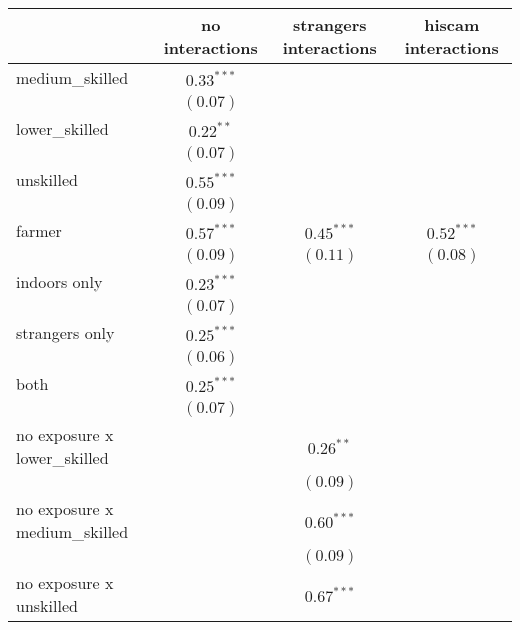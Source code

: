 
\begin{table}
\begin{center}
\begin{tabular}{l c c c}
\hline
 & no interactions & strangers interactions & hiscam interactions \\
\hline
medium\_skilled                  & $0.33^{***}$  &               &               \\
                                 & $(0.07)$      &               &               \\
lower\_skilled                   & $0.22^{**}$   &               &               \\
                                 & $(0.07)$      &               &               \\
unskilled                        & $0.55^{***}$  &               &               \\
                                 & $(0.09)$      &               &               \\
farmer                           & $0.57^{***}$  & $0.45^{***}$  & $0.52^{***}$  \\
                                 & $(0.09)$      & $(0.11)$      & $(0.08)$      \\
indoors only                     & $0.23^{***}$  &               &               \\
                                 & $(0.07)$      &               &               \\
strangers only                   & $0.25^{***}$  &               &               \\
                                 & $(0.06)$      &               &               \\
both                             & $0.25^{***}$  &               &               \\
                                 & $(0.07)$      &               &               \\
no exposure x lower\_skilled     &               & $0.26^{**}$   &               \\
                                 &               & $(0.09)$      &               \\
no exposure x medium\_skilled    &               & $0.60^{***}$  &               \\
                                 &               & $(0.09)$      &               \\
no exposure x unskilled          &               & $0.67^{***}$  &               \\

\end{tabular}
\end{center}
\end{table}
